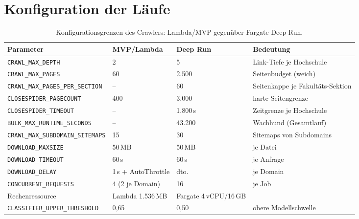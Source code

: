 \chapter{Konfiguration der Läufe}\label{app:konfig}

\begin{table}[htbp]
\centering\small
\caption{Konfigurationsgrenzen des Crawlers: Lambda/MVP gegenüber Fargate Deep Run.}
\begin{tabularx}{\linewidth}{@{}l l l X@{}}
\toprule
\textbf{Parameter} & \textbf{MVP/Lambda} & \textbf{Deep Run} & \textbf{Bedeutung} \\
\midrule
\texttt{CRAWL\_MAX\_DEPTH} & 2 & 5 & Link-Tiefe je Hochschule \\
\texttt{CRAWL\_MAX\_PAGES} & 60 & 2.500 & Seitenbudget (weich) \\
\texttt{CRAWL\_MAX\_PAGES\_PER\_SECTION} & -- & 60 & Seitenkappe je Fakultäts-Sektion \\
\texttt{CLOSESPIDER\_PAGECOUNT} & 400 & 3.000 & harte Seitengrenze \\
\texttt{CLOSESPIDER\_TIMEOUT} & -- & 1.800\,s & Zeitgrenze je Hochschule \\
\texttt{BULK\_MAX\_RUNTIME\_SECONDS} & -- & 43.200 & Wachhund (Gesamtlauf) \\
\texttt{CRAWL\_MAX\_SUBDOMAIN\_SITEMAPS} & 15 & 30 & Sitemaps von Subdomains \\
\texttt{DOWNLOAD\_MAXSIZE} & 50\,MB & 50\,MB & je Datei \\
\texttt{DOWNLOAD\_TIMEOUT} & 60\,s & 60\,s & je Anfrage \\
\texttt{DOWNLOAD\_DELAY} & 1\,s + AutoThrottle & dto. & je Domain \\
\texttt{CONCURRENT\_REQUESTS} & 4 (2 je Domain) & 16 & je Job \\
Rechenressource & Lambda 1.536\,MB & Fargate 4\,vCPU/16\,GB & \\
\texttt{CLASSIFIER\_UPPER\_THRESHOLD} & 0,65 & 0,50 & obere Modellschwelle \\
\bottomrule
\end{tabularx}
\end{table}

